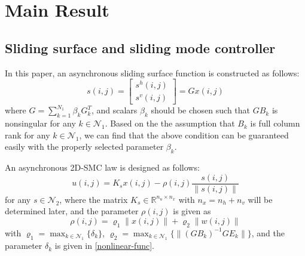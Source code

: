 \documentclass[conference]{IEEEtran}
\begin{document}
\section{Main Result}

\subsection{ Sliding surface and sliding mode controller} \label{sliding-surface}
	In this paper, an asynchronous sliding surface function is constructed as follows: 
	\begin{equation}\label{siding-surface-equation}	
		s(i,j) = \begin{bmatrix}
					s^{h}(i,j)\\
					s^{v}(i,j)
					\end{bmatrix}
			   = Gx(i,j)
	\end{equation}
	where $G=\sum_{k=1}^{N_{1}}\beta_{k}G^{T}_{k}$, and scalars $\beta_{k}$ should be chosen such that $GB_{k}$ is nonsingular for any $k\in\mathcal{N}_{1}$. Based on the the assumption that $B_{k}$ is full column rank for any $k\in\mathcal{N}_{1}$, we can find that the above condition can be guaranteed easily with the properly selected parameter $\beta_{k}$. 
 	
 	An asynchronous 2D-SMC law is designed as follows:
	\begin{equation}\label{smc-law}
		u(i,j) = K_{s}x(i,j)-\rho(i,j)\frac{s(i,j)}{\|s(i,j)\|}
	\end{equation}
	for any $s\in\mathcal{N}_{2}$, where the matrix $K_{s}\in\mathbb{R}^{n_u\times n_x}$ with $n_x=n_h+n_v$ will be determined later, and the parameter $\rho(i,j)$ is given as
	\begin{equation}
	\rho(i,j) = \varrho_{1}\|x(i,j)\| + \varrho_{2}\|w(i,j)\|
	\end{equation}
	with $\varrho_{1}=\max_{k\in\mathcal{N}_{1}} \{\delta_{k} \}$, $\varrho_{2} = \max_{k\in\mathcal{N}_{1}}\{\|(GB_{k})^{-1}GE_{k}\| \} $, and the parameter $\delta_{k}$ is given in \eqref{nonlinear-func}. 
	
\end{document}
